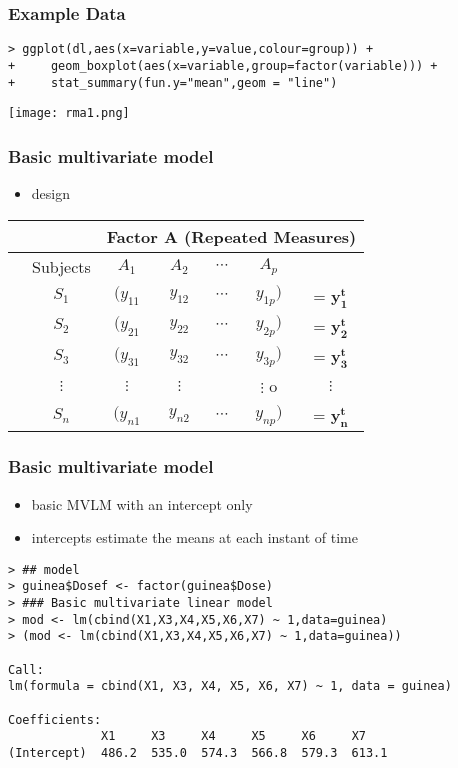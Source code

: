 \begin{frame}[fragile]\frametitle{Example Data}
\scriptsize
\begin{verbatim}
> ggplot(dl,aes(x=variable,y=value,colour=group)) +
+     geom_boxplot(aes(x=variable,group=factor(variable))) +
+     stat_summary(fun.y="mean",geom = "line") 
\end{verbatim}
  \begin{center}
    \texttt{[image: rma1.png]}
  \end{center}
\end{frame}

\begin{frame}\frametitle{Basic multivariate model}
  \begin{itemize}
  \item design
  \end{itemize}
  \begin{center}
    \begin{tabular}{c c c c c c c}
      & & \multicolumn{5}{c}{Factor A (Repeated Measures)} \\ \hline
      & Subjects & $A_1$ & $A_2$ & $\cdots$ & $A_p$ & \\
      & $S_{1}$ & $( y_{11}$ & $y_{12}$ & $\cdots$ & $y_{1p} )$ & = $\mathbf{y^t_{1}}$ \\
      & $S_{2}$ & $( y_{21}$ & $y_{22}$ & $\cdots$ & $y_{2p} )$ & = $\mathbf{y^t_{2}}$ \\
      & $S_{3}$ & $( y_{31}$ & $y_{32}$ & $\cdots$ & $y_{3p} )$ & = $\mathbf{y^t_{3}}$ \\
      & $\vdots$ & $\vdots$ & $\vdots$ &  & $ \vdots$ o& $ \vdots $ \\
      & $S_{n}$ & $( y_{n1}$ & $y_{n2}$ & $\cdots$ & $y_{np} )$ & = $\mathbf{y^t_{n}}$ \\
    \end{tabular}
  \end{center}
\end{frame}


\begin{frame}[fragile]\frametitle{Basic multivariate model}
  \begin{itemize}
  \item basic MVLM with an intercept only
  \item intercepts estimate the means at each instant of time
  \end{itemize}\scriptsize
\begin{verbatim}
> ## model
> guinea$Dosef <- factor(guinea$Dose)
> ### Basic multivariate linear model
> mod <- lm(cbind(X1,X3,X4,X5,X6,X7) ~ 1,data=guinea)
> (mod <- lm(cbind(X1,X3,X4,X5,X6,X7) ~ 1,data=guinea))

Call:
lm(formula = cbind(X1, X3, X4, X5, X6, X7) ~ 1, data = guinea)

Coefficients:
             X1     X3     X4     X5     X6     X7   
(Intercept)  486.2  535.0  574.3  566.8  579.3  613.1
\end{verbatim}
\end{frame}


